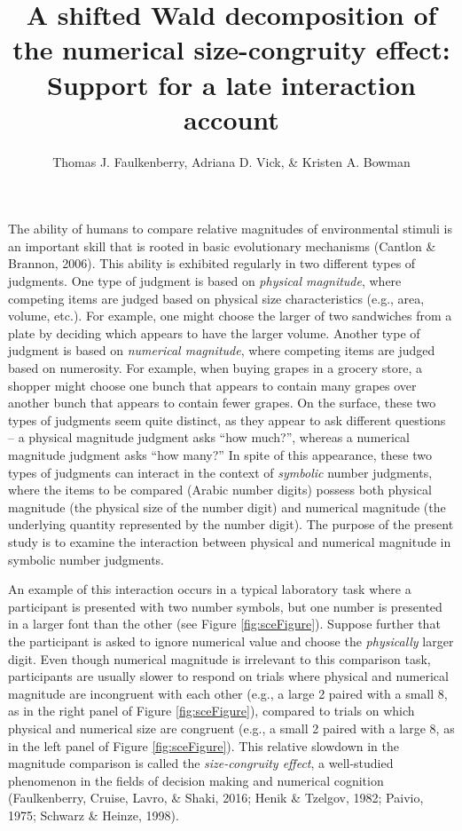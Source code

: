 \documentclass[english,,man]{apa6}
\title{A shifted Wald decomposition of the numerical size-congruity effect:
Support for a late interaction account}
\author{Thomas J. Faulkenberry, Adriana D. Vick, \& Kristen A. Bowman}
\date{}
\affiliation{
\vspace{0.5cm}
 Tarleton State University}
\theoremstyle{definition}
\theoremstyle{definition}
\theoremstyle{definition}
\theoremstyle{remark}
\begin{document}
\maketitle

The ability of humans to compare relative magnitudes of environmental
stimuli is an important skill that is rooted in basic evolutionary
mechanisms (Cantlon \& Brannon, 2006). This ability is exhibited
regularly in two different types of judgments. One type of judgment is
based on \emph{physical magnitude}, where competing items are judged
based on physical size characteristics (e.g., area, volume, etc.). For
example, one might choose the larger of two sandwiches from a plate by
deciding which appears to have the larger volume. Another type of
judgment is based on \emph{numerical magnitude}, where competing items
are judged based on numerosity. For example, when buying grapes in a
grocery store, a shopper might choose one bunch that appears to contain
many grapes over another bunch that appears to contain fewer grapes. On
the surface, these two types of judgments seem quite distinct, as they
appear to ask different questions -- a physical magnitude judgment asks
\enquote{how much?}, whereas a numerical magnitude judgment asks
\enquote{how many?} In spite of this appearance, these two types of
judgments can interact in the context of \emph{symbolic} number
judgments, where the items to be compared (Arabic number digits) possess
both physical magnitude (the physical size of the number digit) and
numerical magnitude (the underlying quantity represented by the number
digit). The purpose of the present study is to examine the interaction
between physical and numerical magnitude in symbolic number judgments.

An example of this interaction occurs in a typical laboratory task where
a participant is presented with two number symbols, but one number is
presented in a larger font than the other (see Figure
\ref{fig:sceFigure}). Suppose further that the participant is asked to
ignore numerical value and choose the \emph{physically} larger digit.
Even though numerical magnitude is irrelevant to this comparison task,
participants are usually slower to respond on trials where physical and
numerical magnitude are incongruent with each other (e.g., a large 2
paired with a small 8, as in the right panel of Figure
\ref{fig:sceFigure}), compared to trials on which physical and numerical
size are congruent (e.g., a small 2 paired with a large 8, as in the
left panel of Figure \ref{fig:sceFigure}). This relative slowdown in the
magnitude comparison is called the \emph{size-congruity effect}, a
well-studied phenomenon in the fields of decision making and numerical
cognition (Faulkenberry, Cruise, Lavro, \& Shaki, 2016; Henik \&
Tzelgov, 1982; Paivio, 1975; Schwarz \& Heinze, 1998).
\end{document}
